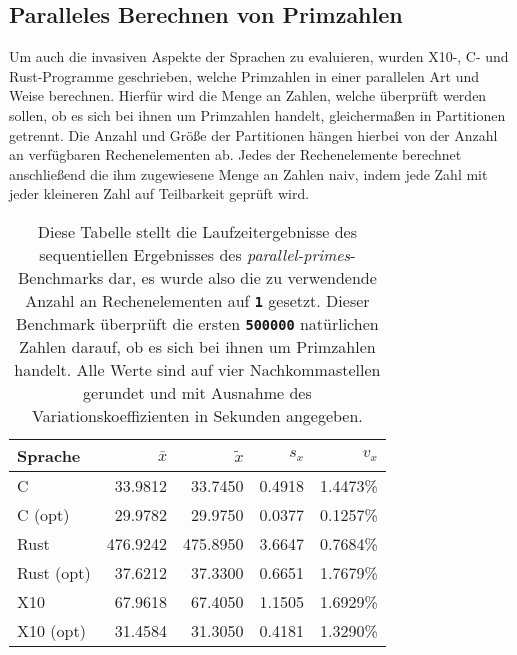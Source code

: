 \subsection{Paralleles Berechnen von Primzahlen}

Um auch die invasiven Aspekte der Sprachen zu evaluieren, wurden X10-, C- und Rust-Programme geschrieben,
welche Primzahlen in einer parallelen Art und Weise berechnen.
Hierfür wird die Menge an Zahlen, welche überprüft werden sollen,
ob es sich bei ihnen um Primzahlen handelt, gleichermaßen in Partitionen getrennt.
Die Anzahl und Größe der Partitionen hängen hierbei von der Anzahl an verfügbaren Rechenelementen ab.
Jedes der Rechenelemente berechnet anschließend die ihm zugewiesene Menge an Zahlen naiv,
indem jede Zahl mit jeder kleineren Zahl auf Teilbarkeit geprüft wird.

\begin{table}
	\begin{center}
		\begin{tabular}{lrrrr}
			\toprule
			Sprache & $\bar{x}$ & $\tilde{x}$ & $s_x$ & $v_x$ \\
			\midrule
			C          &  33.9812 &  33.7450 & 0.4918 & 1.4473\% \\
			C (opt)    &  29.9782 &  29.9750 & 0.0377 & 0.1257\% \\
			Rust       & 476.9242 & 475.8950 & 3.6647 & 0.7684\% \\
			Rust (opt) &  37.6212 &  37.3300 & 0.6651 & 1.7679\% \\
			X10        &  67.9618 &  67.4050 & 1.1505 & 1.6929\% \\
			X10 (opt)  &  31.4584 &  31.3050 & 0.4181 & 1.3290\% \\
			\bottomrule
		\end{tabular}
	\end{center}
	\caption{
		Diese Tabelle stellt die Laufzeitergebnisse des sequentiellen Ergebnisses des
		\textit{parallel-primes}-Benchmarks dar,
		es wurde also die zu verwendende Anzahl an Rechenelementen auf \texttt{\textsc{\textbf{1}}} gesetzt.
		Dieser Benchmark überprüft die ersten \texttt{\textsc{\textbf{500000}}} natürlichen Zahlen darauf,
		ob es sich bei ihnen um Primzahlen handelt.
		Alle Werte sind auf vier Nachkommastellen gerundet und mit Ausnahme des Variationskoeffizienten
		in Sekunden angegeben.
	}
	\label{fig:primes_parallel_one_table}
\end{table}

